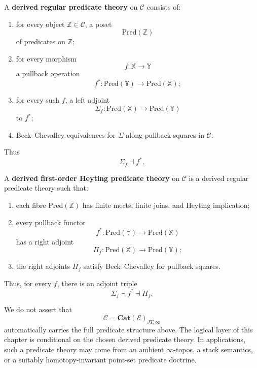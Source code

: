 \begin{definition}
\label{def:derived-regular-predicate-theory}
A \textbf{derived regular predicate theory} on \(\mathcal C\) consists of:
\begin{enumerate}
\item for every object \(\mathbb Z\in\mathcal C\), a poset
\[
\mathrm{Pred}(\mathbb Z)
\]
of predicates on \(\mathbb Z\);
\item for every morphism
\[
f:\mathbb X\to\mathbb Y
\]
a pullback operation
\[
f^\ast:\mathrm{Pred}(\mathbb Y)\to\mathrm{Pred}(\mathbb X);
\]
\item for every such \(f\), a left adjoint
\[
\Sigma_f:\mathrm{Pred}(\mathbb X)\to\mathrm{Pred}(\mathbb Y)
\]
to \(f^\ast\);
\item Beck--Chevalley equivalences for \(\Sigma\) along pullback squares in
\(\mathcal C\).
\end{enumerate}
Thus
\[
\Sigma_f\dashv f^\ast.
\]
\end{definition}

\begin{definition}
\label{def:derived-heyting-predicate-theory}
A \textbf{derived first-order Heyting predicate theory} on \(\mathcal C\) is a
derived regular predicate theory such that:
\begin{enumerate}
\item each fibre \(\mathrm{Pred}(\mathbb Z)\) has finite meets, finite joins,
and Heyting implication;
\item every pullback functor
\[
f^\ast:\mathrm{Pred}(\mathbb Y)\to\mathrm{Pred}(\mathbb X)
\]
has a right adjoint
\[
\Pi_f:\mathrm{Pred}(\mathbb X)\to\mathrm{Pred}(\mathbb Y);
\]
\item the right adjoints \(\Pi_f\) satisfy Beck--Chevalley for pullback
squares.
\end{enumerate}
Thus, for every \(f\), there is an adjoint triple
\[
\Sigma_f\dashv f^\ast\dashv \Pi_f.
\]
\end{definition}

\begin{remark}
\label{rem:predicate-theory-not-automatic}
We do not assert that
\[
\mathcal C=\mathbf{Cat}(\mathcal E)_{JT,\infty}
\]
automatically carries the full predicate structure above. The logical layer of
this chapter is conditional on the chosen derived predicate theory. In
applications, such a predicate theory may come from an ambient
\(\infty\)-topos, a stack semantics, or a suitably homotopy-invariant
point-set predicate doctrine.
\end{remark}

